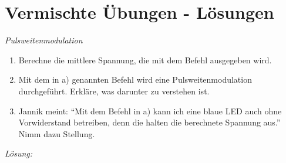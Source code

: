 \documentclass[ngerman, 11pt]{scrreprt}
\begin{document}
	\setcounter{chapter}{5}
	\setcounter{section}{8}
	\setcounter{aufgabennummer}{17}
	\onehalfspacing
	
	\section{Vermischte Übungen - Lösungen}
	
	\begin{aufgabe} \emph{Pulsweitenmodulation}
		
		\begin{enumerate}[label=\alph*), itemsep=0mm,parsep=0mm]
			\item Berechne die mittlere Spannung, die mit dem Befehl  ausgegeben wird.
			\item Mit dem in a) genannten Befehl wird eine Pulsweitenmodulation durchgeführt. Erkläre, was darunter zu verstehen ist.
			\item Jannik meint: \enquote{Mit dem Befehl in a) kann ich eine blaue LED auch ohne Vorwiderstand betreiben, denn die halten die berechnete Spannung aus.} Nimm dazu Stellung.
		\end{enumerate}
	\end{aufgabe}

	\bigskip
	\emph{Lösung:}
	
\end{document}
